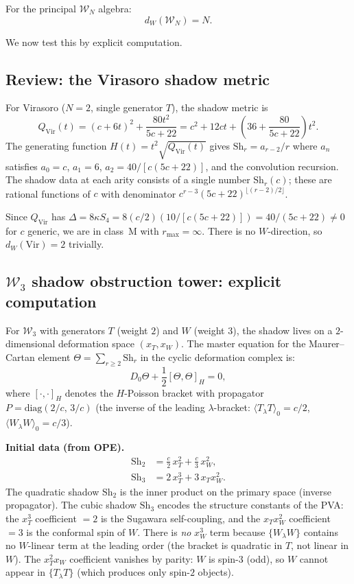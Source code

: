 \documentclass[11pt]{article}
\newcommand{\cW}{\mathcal{W}}
\begin{document}
\begin{conjecture}
\label{conj:w-essential-depth}
For the principal $\cW_N$ algebra:
\[
d_W(\cW_N) = N.
\]
\end{conjecture}

We now test this by explicit computation.

\subsection*{Review: the Virasoro shadow metric}

For Virasoro ($N = 2$, single generator $T$), the shadow metric
is
\[
Q_{\mathrm{Vir}}(t)
= (c + 6t)^2 + \frac{80t^2}{5c+22}
= c^2 + 12ct + \left(36 + \frac{80}{5c+22}\right)t^2.
\]
The generating function $H(t) = t^2\sqrt{Q_{\mathrm{Vir}}(t)}$
gives $\mathrm{Sh}_r = a_{r-2}/r$ where $a_n$ satisfies
$a_0 = c$, $a_1 = 6$,
$a_2 = 40/[c(5c{+}22)]$, and the convolution recursion.
The shadow data at each arity consists of a single number
$\mathrm{Sh}_r(c)$; these are rational functions of $c$ with
denominator $c^{r-3}(5c+22)^{\lfloor(r-2)/2\rfloor}$.

Since $Q_{\mathrm{Vir}}$ has $\Delta = 8\kappa S_4
= 8(c/2)(10/[c(5c{+}22)]) = 40/(5c{+}22) \ne 0$ for $c$
generic, we are in class~M with $r_{\max} = \infty$.
There is no $W$-direction, so $d_W(\mathrm{Vir}) = 2$
trivially.

\subsection*{$\cW_3$ shadow obstruction tower: explicit computation}

For $\cW_3$ with generators $T$ (weight $2$) and $W$
(weight $3$), the shadow lives on a $2$-dimensional deformation
space $(x_T, x_W)$.  The master equation for the Maurer--Cartan
element $\Theta = \sum_{r \ge 2} \mathrm{Sh}_r$ in the cyclic
deformation complex is:
\[
D_0 \Theta + \frac{1}{2}[\Theta, \Theta]_H = 0,
\]
where $[\cdot, \cdot]_H$ denotes the $H$-Poisson bracket with
propagator $P = \mathrm{diag}(2/c,\, 3/c)$ (the inverse of the
leading $\lambda$-bracket: $\langle T_\lambda T \rangle_0 = c/2$,
$\langle W_\lambda W \rangle_0 = c/3$).

\medskip
\noindent\textbf{Initial data (from OPE).}
\begin{align*}
\mathrm{Sh}_2
&= \frac{c}{2}\,x_T^2 + \frac{c}{3}\,x_W^2,
\\[4pt]
\mathrm{Sh}_3
&= 2\,x_T^3 + 3\,x_T x_W^2.
\end{align*}
The quadratic shadow $\mathrm{Sh}_2$ is the inner product on the
primary space (inverse propagator).  The cubic shadow
$\mathrm{Sh}_3$ encodes the structure constants of the PVA: the
$x_T^3$ coefficient $= 2$ is the Sugawara self-coupling, and the
$x_T x_W^2$ coefficient $= 3$ is the conformal spin of $W$.
There is \emph{no} $x_W^3$ term because $\{W_\lambda W\}$
contains no $W$-linear term at the leading order (the bracket
is quadratic in $T$, not linear in $W$).  The $x_T^2 x_W$
coefficient vanishes by parity: $W$ is spin-$3$ (odd), so
$W$ cannot appear in $\{T_\lambda T\}$ (which produces only
spin-$2$ objects).
\end{document}
